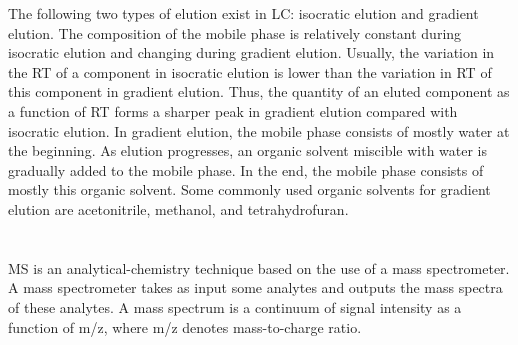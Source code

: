 The following two types of elution exist in \gls{LC}: isocratic elution and gradient elution. %
The composition of the mobile phase is relatively constant during isocratic elution and changing during gradient elution.	
Usually, the variation in the \gls{RT} of a component in isocratic elution is lower than the variation in \gls{RT} of this component in gradient elution. 
Thus, the quantity of an eluted component as a function of \gls{RT} forms a sharper peak in gradient elution compared with isocratic elution.
In gradient elution, the mobile phase consists of mostly water at the beginning.
As elution progresses, an organic solvent miscible with water is gradually added to the mobile phase. 
In the end, the mobile phase consists of mostly this organic solvent. 
Some commonly used organic solvents for gradient elution are acetonitrile, methanol, and tetrahydrofuran.

  
\section{\texorpdfstring{}{MS}}
\label{sec:MS:MS}

\Gls{MS} is an analytical-chemistry technique based on the use of a mass spectrometer.
A mass spectrometer takes as input some analytes and outputs the mass spectra of these analytes.
A mass spectrum is a continuum of signal intensity as a function of \gls{m/z}, where \gls{m/z} denotes mass-to-charge ratio. 

